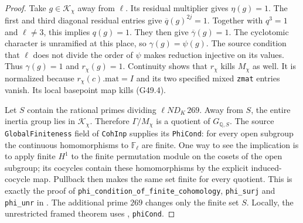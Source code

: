 \begin{proof}
Take $g\in\mathcal K_\chi$ away from $\ell$.
Its residual multiplier gives $\eta(g)=1$.
The first and third diagonal residual entries give
$\overline q(g)^{2j}=1$.  Together with $q^3=1$ and
$\ell\ne3$, this implies $q(g)=1$.
They then give $\overline\gamma(g)=1$.
The cyclotomic character is unramified at this place, so
$\gamma(g)=\psi(g)$.  The source condition that $\ell$
does not divide the order of $\psi$ makes reduction
injective on its values.  Thus $\gamma(g)=1$ and
$r_\chi(g)=1$.
Continuity shows that $r_\chi$ kills $M_\chi$ as well.
It is normalized because $r_\chi(c).\mathrm{mat}=I$
and its two specified mixed \texttt{zmat} entries vanish.
Its local basepoint map kills (G49.4).

Let $S$ contain the rational primes dividing
$\ell N D_K\,269$.  Away from $S$, the entire inertia
group lies in $\mathcal K_\chi$.  Therefore
$\Gamma/M_\chi$ is a quotient of $G_{\mathbb Q,S}$.
The source \texttt{GlobalFiniteness} field of
\texttt{CohInp} supplies its \texttt{PhiCond}: for every
open subgroup the continuous homomorphisms to
$\mathbb F_\ell$ are finite.  One way to see the implication
is to apply finite $H^1$ to the finite permutation module
on the cosets of the open subgroup; its cocycles contain
these homomorphisms by the explicit induced-cocycle map.
Pullback then makes the same set finite for every quotient.
This is exactly the proof of
\texttt{phi\_condition\_of\_finite\_cohomology},
\texttt{phi\_surj} and \texttt{phi\_unr} in
.
The additional prime $269$ changes only the finite set $S$.
Locally, the unrestricted framed theorem uses
, \texttt{phiCond}.


\end{proof}
